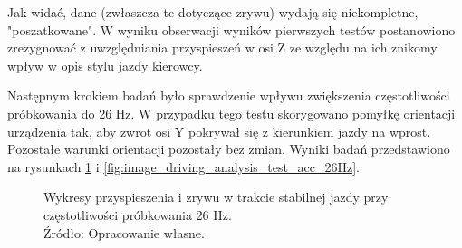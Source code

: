 Jak widać, dane (zwłaszcza te dotyczące zrywu) wydają się niekompletne, "poszatkowane". W wyniku obserwacji wyników pierwszych testów postanowiono zrezygnować z uwzględniania przyspieszeń w osi Z ze względu na ich znikomy wpływ w opis stylu jazdy kierowcy.

Następnym krokiem badań było sprawdzenie wpływu zwiększenia częstotliwości próbkowania do 26 Hz. W przypadku tego testu skorygowano pomyłkę orientacji urządzenia tak, aby zwrot osi Y pokrywał się z kierunkiem jazdy na wprost. Pozostałe warunki orientacji pozostały bez zmian. Wyniki badań przedstawiono na rysunkach \ref{fig:image_driving_analysis_test_26Hz} i \ref{fig:image_driving_analysis_test_acc_26Hz}.


\begin{figure}[H]
\centering
	\qquad
	
	\caption{Wykresy przyspieszenia i zrywu w trakcie stabilnej jazdy przy częstotliwości próbkowania 26 Hz.
	\\Źródło: Opracowanie własne.}
	\label{fig:image_driving_analysis_test_26Hz}
\end{figure}


